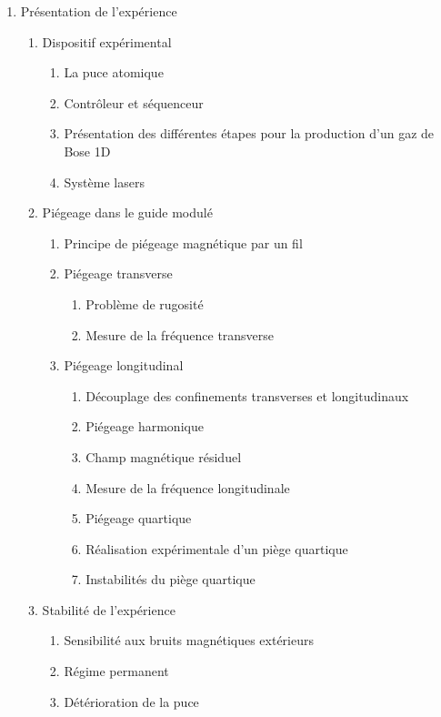 \documentclass[8pt, landscape]{report}
\begin{document}
\begin{multicols}{3} %

\begin{enumerate}
    \item Présentation de l’expérience
    \begin{enumerate}
        \item Dispositif expérimental
        \begin{enumerate}
            \item La puce atomique
            \item Contrôleur et séquenceur
            \item Présentation des différentes étapes pour la production d’un gaz de Bose 1D
            \item Système lasers
        \end{enumerate}
        \item Piégeage dans le guide modulé
        \begin{enumerate}
            \item Principe de piégeage magnétique par un fil
            \item Piégeage transverse
            \begin{enumerate}
                \item Problème de rugosité
                \item Mesure de la fréquence transverse
            \end{enumerate}
            \item Piégeage longitudinal
            \begin{enumerate}
                \item Découplage des confinements transverses et longitudinaux
                \item Piégeage harmonique
                \item Champ magnétique résiduel
                \item Mesure de la fréquence longitudinale
                \item Piégeage quartique
                \item Réalisation expérimentale d’un piège quartique
                \item Instabilités du piège quartique
            \end{enumerate}
        \end{enumerate}
        \item Stabilité de l’expérience
        \begin{enumerate}
            \item Sensibilité aux bruits magnétiques extérieurs
            \item Régime permanent
            \item Détérioration de la puce
        \end{enumerate}
    \end{enumerate}


\end{enumerate}
\end{multicols}
\end{document}
